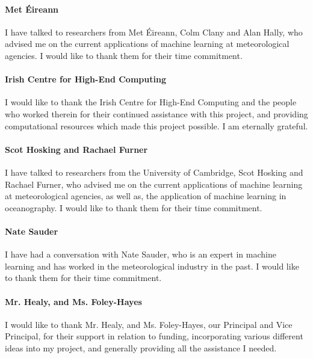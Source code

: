 \paragraph{Met Éireann}
I have talked to researchers from Met Éireann, Colm Clany and Alan Hally, who advised me on the current applications of machine learning at meteorological agencies. I would like to thank them for their time commitment.

\paragraph{Irish Centre for High-End Computing}
I would like to thank the Irish Centre for High-End Computing and the people who worked therein for their continued assistance with this project, and providing computational resources which made this project possible. I am eternally grateful.

\paragraph{Scot Hosking and Rachael Furner}
I have talked to researchers from the University of Cambridge, Scot Hosking and Rachael Furner, who advised me on the current applications of machine learning at meteorological agencies, as well as, the application of machine learning in oceanography. I would like to thank them for their time commitment.

\paragraph{Nate Sauder}
I have had a conversation with Nate Sauder, who is an expert in machine learning and has worked in the meteorological industry in the past. I would like to thank them for their time commitment.

\paragraph{Mr. Healy, and Ms. Foley-Hayes}
I would like to thank Mr. Healy, and Ms. Foley-Hayes, our Principal and Vice Principal, for their support in relation to funding, incorporating various different ideas into my project, and generally providing all the assistance I needed.
